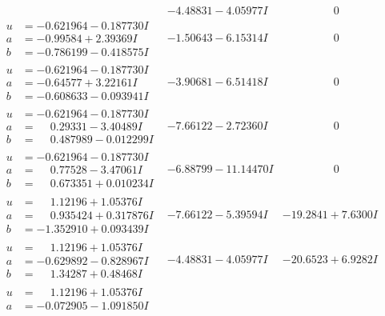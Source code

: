 \documentclass[1p]{elsarticle_modified}
\theoremstyle{definition}
\begin{document}
$$\begin{array}{c|c|c}
 & -4.48831 - 4.05977 I & \phantom{-0.000000 } 0 \\ \hline\begin{aligned}
u &= -0.621964 - 0.187730 I \\
a &= -0.99584 + 2.39369 I \\
b &= -0.786199 - 0.418575 I\end{aligned}
 & -1.50643 - 6.15314 I & \phantom{-0.000000 } 0 \\ \hline\begin{aligned}
u &= -0.621964 - 0.187730 I \\
a &= -0.64577 + 3.22161 I \\
b &= -0.608633 - 0.093941 I\end{aligned}
 & -3.90681 - 6.51418 I & \phantom{-0.000000 } 0 \\ \hline\begin{aligned}
u &= -0.621964 - 0.187730 I \\
a &= \phantom{-}0.29331 - 3.40489 I \\
b &= \phantom{-}0.487989 - 0.012299 I\end{aligned}
 & -7.66122 - 2.72360 I & \phantom{-0.000000 } 0 \\ \hline\begin{aligned}
u &= -0.621964 - 0.187730 I \\
a &= \phantom{-}0.77528 - 3.47061 I \\
b &= \phantom{-}0.673351 + 0.010234 I\end{aligned}
 & -6.88799 - 11.14470 I & \phantom{-0.000000 } 0 \\ \hline\begin{aligned}
u &= \phantom{-}1.12196 + 1.05376 I \\
a &= \phantom{-}0.935424 + 0.317876 I \\
b &= -1.352910 + 0.093439 I\end{aligned}
 & -7.66122 - 5.39594 I & -19.2841 + 7.6300 I \\ \hline\begin{aligned}
u &= \phantom{-}1.12196 + 1.05376 I \\
a &= -0.629892 - 0.828967 I \\
b &= \phantom{-}1.34287 + 0.48468 I\end{aligned}
 & -4.48831 - 4.05977 I & -20.6523 + 6.9282 I \\ \hline\begin{aligned}
u &= \phantom{-}1.12196 + 1.05376 I \\
a &= -0.072905 - 1.091850 I \\

\end{aligned}
\end{array}$$
\end{document}

